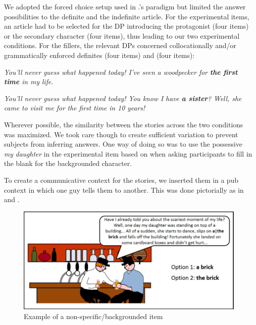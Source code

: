 \documentclass[output=paper,
modfonts
]{langscibook}
\begin{document}
We adopted the forced choice setup used in \citeauthor{IoninKoWexler2004}.’s  paradigm but limited the answer possibilities to the definite and the indefinite article. For the experimental items, an article had to be selected for the DP introducing the protagonist (four items) or the secondary character (four items), thus leading to our two experimental conditions. For the fillers, the relevant DPs concerned collocationally and/or grammatically enforced definites (four items) and  (four items):

\ea\label{ex:lebruyn:4}
\textit{You’ll never guess what happened today! I’ve seen a woodpecker for \textbf{the first time} in my life.}
\z 

\ea\label{ex:lebruyn:5}
\textit{You’ll never guess what happened today! You know I have \textbf{a sister}? Well, she came to visit 	me for the first time in 10 years!}
\z 

Wherever possible, the similarity between the stories across the two conditions was maximized. We took care though to create sufficient variation to prevent subjects from inferring answers. One way of doing so was to use the possessive \textit{my daughter} in the experimental item based on  when asking participants to fill in the blank for the backgrounded character.

To create a communicative context for the stories, we inserted them in a pub context in which one guy tells them to another. This was done pictorially as in  and .

\begin{figure}[h]
\includegraphics[height=.25\textheight]{figures/fig1.png}
\caption{Example of a non-specific/backgrounded item}
\label{fig:lebruyn:1}
\end{figure}
\end{document}
